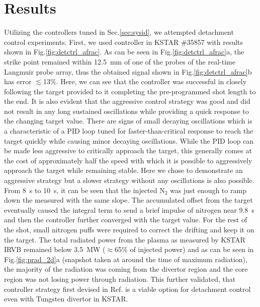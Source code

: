 \section{Results}
\label{sec:results}





Utilizing the controllers tuned in Sec.\ref{sec:sysid}, we attempted detachment control experiments.
First, we used \Afrac{} controller in KSTAR \#35857 with results shown in Fig.\ref{fig:detctrl_afrac}.
As can be seen in Fig.\ref{fig:detctrl_afrac}a, the strike point remained within 12.5~mm of one of the probes of the real-time Langmuir probe array, thus the obtained \Afrac{} signal shown in Fig.\ref{fig:detctrl_afrac}b has error $\lesssim$13\%.
Here, we can see that the controller was successful in closely following the target provided to it completing the pre-programmed shot length to the end.
It is also evident that the aggressive control strategy was good and did not result in any long sustained oscillations while providing a quick response to the changing target value.
There are signs of small decaying oscillations which is a characteristic of a PID loop tuned for faster-than-critical response to reach the target quickly while causing minor decaying oscillations.
While the PID loop can be made less aggressive to critically approach the target, this generally comes at the cost of approximately half the speed with which it is possible to aggressively approach the target while remaining stable.
Here we chose to demonstrate an aggressive strategy but a slower strategy without any oscillations is also possible.
From 8~s to 10~s, it can be seen that the injected N$_2$ was just enough to ramp down the measured \Afrac{} with the same slope.
The accumulated offset from the target eventually caused the integral term to send a brief impulse of nitrogen near 9.8~s and then the controller further converged with the target value.
For the rest of the shot, small nitrogen puffs were required to correct the drifting \Afrac{} and keep it on the target.
The total radiated power from the plasma as measured by KSTAR \ac{IRVB} remained below 3.5~MW ($\approx$65\% of injected power) and as can be seen in Fig.\ref{fig:prad_2d}a (snapshot taken at around the time of maximum radiation), the majority of the radiation was coming from the divertor region and the core region was not losing power through radiation.
This further validated, that \Afrac{} controller strategy first devised in Ref.\cite{Eldon_2022_PPCF} is a viable option for detachment control even with Tungsten divertor in KSTAR.

